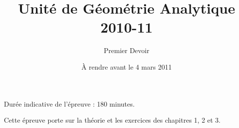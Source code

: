 



\title{Unité de Géométrie Analytique  2010-11 }
\author{Premier Devoir}
\date{À rendre avant le 4 mars 2011}


\maketitle


\vspace{1cm}

Durée indicative de l'épreuve : 180 minutes.  

Cette épreuve porte sur la théorie et les exercices des chapitres 1, 2 et 3. 

\vspace{1cm}








\newpage






\corrChapitre{}



